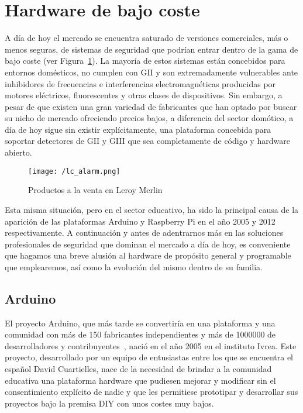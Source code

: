 \section{Hardware de bajo coste}
\label{chap:low-cost-hw}

A día de hoy el mercado se encuentra saturado de versiones comerciales, más o menos seguras, de sistemas de seguridad que podrían entrar dentro de la gama de bajo coste (ver Figura~\ref{fig:lc_alarm}). La mayoría de estos sistemas están concebidos para entornos domésticos, no cumplen con \acs{GII} y son extremadamente vulnerables ante inhibidores de frecuencias e interferencias electromagnéticas producidas por motores eléctricos, fluorescentes y otras clases de dispositivos. Sin embargo, a pesar de que existen una gran variedad de fabricantes que han optado por buscar su nicho de mercado ofreciendo precios bajos, a diferencia del sector domótico, a día de hoy sigue sin existir explícitamente, una plataforma concebida para soportar detectores de \acs{GII} y \acs{GIII} que sea completamente de código y hardware abierto.

\begin{figure}[!h]
\centering
\texttt{[image: /lc\_alarm.png]}
\caption{Productos a la venta en Leroy Merlin~\cite{Leroy}}
\label{fig:lc_alarm}
\end{figure}

Esta misma situación, pero en el sector educativo, ha sido la principal causa de la aparición de las plataformas Arduino y Raspberry Pi en el año 2005 y 2012 respectivamente. A continuación y antes de adentrarnos más en las soluciones profesionales de seguridad que dominan el mercado a día de hoy, es conveniente que hagamos una breve alusión al hardware de propósito general y programable que emplearemos, así como la evolución del mismo dentro de su familia.

\subsection{Arduino}
El proyecto Arduino, que más tarde se convertiría en una plataforma y una comunidad con más de 150 fabricantes independientes y más de 1000000 de desarrolladores y contribuyentes~\cite{TEDArduino}, nació en el año 2005 en el instituto Ivrea. Este proyecto, desarrollado por un equipo de entusiastas entre los que se encuentra el español David Cuartielles, nace de la necesidad de brindar a la comunidad educativa una plataforma hardware que pudiesen mejorar y modificar sin el consentimiento explícito de nadie y que les permitiese prototipar y desarrollar sus proyectos bajo la premisa \acs{DIY} con unos costes muy bajos.

